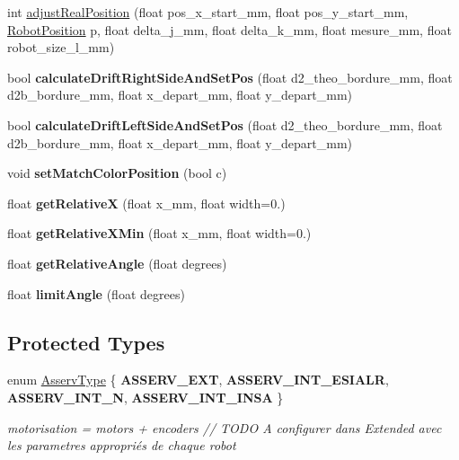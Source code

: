 \begin{DoxyCompactItemize}
int \hyperlink{classAsserv_a1677fd20a9cb16f78c609951e073550e}{adjust\+Real\+Position} (float pos\+\_\+x\+\_\+start\+\_\+mm, float pos\+\_\+y\+\_\+start\+\_\+mm, \hyperlink{structRobotPosition}{Robot\+Position} p, float delta\+\_\+j\+\_\+mm, float delta\+\_\+k\+\_\+mm, float mesure\+\_\+mm, float robot\+\_\+size\+\_\+l\+\_\+mm)
\item 
\mbox{\label{classAsserv_a9e997a871e745e687a4088103378bae3}} 
bool {\bfseries calculate\+Drift\+Right\+Side\+And\+Set\+Pos} (float d2\+\_\+theo\+\_\+bordure\+\_\+mm, float d2b\+\_\+bordure\+\_\+mm, float x\+\_\+depart\+\_\+mm, float y\+\_\+depart\+\_\+mm)
\item 
\mbox{\label{classAsserv_a314e3ff9a8a538a23d26dcb802386024}} 
bool {\bfseries calculate\+Drift\+Left\+Side\+And\+Set\+Pos} (float d2\+\_\+theo\+\_\+bordure\+\_\+mm, float d2b\+\_\+bordure\+\_\+mm, float x\+\_\+depart\+\_\+mm, float y\+\_\+depart\+\_\+mm)
\item 
\mbox{\label{classAsserv_a1405746fd8b2486724eec8baf4e72f74}} 
void {\bfseries set\+Match\+Color\+Position} (bool c)
\item 
\mbox{\label{classAsserv_a7a7e84f37ab3d94c10bcfe0542f7c5ff}} 
float {\bfseries get\+RelativeX} (float x\+\_\+mm, float width=0.)
\item 
\mbox{\label{classAsserv_ac2c223c7a13318de135088a30efc076d}} 
float {\bfseries get\+Relative\+X\+Min} (float x\+\_\+mm, float width=0.)
\item 
\mbox{\label{classAsserv_a790f7ad183fe585a87cefb7ad5688ffe}} 
float {\bfseries get\+Relative\+Angle} (float degrees)
\item 
\mbox{\label{classAsserv_a2a48f3a3252a4311e96f20e2595febff}} 
float {\bfseries limit\+Angle} (float degrees)
\end{DoxyCompactItemize}
\subsection*{Protected Types}
\begin{DoxyCompactItemize}
\item 
enum \hyperlink{classAsserv_ad1cfde496b9ab7fb2cf6fa0d2cf6d8fc}{Asserv\+Type} \{ {\bfseries A\+S\+S\+E\+R\+V\+\_\+\+E\+XT}, 
{\bfseries A\+S\+S\+E\+R\+V\+\_\+\+I\+N\+T\+\_\+\+E\+S\+I\+A\+LR}, 
{\bfseries A\+S\+S\+E\+R\+V\+\_\+\+I\+N\+T\+\_\+N}, 
{\bfseries A\+S\+S\+E\+R\+V\+\_\+\+I\+N\+T\+\_\+\+I\+N\+SA}
 \}\begin{DoxyCompactList}\small\item\em motorisation = motors + encoders // T\+O\+DO A configurer dans Extended avec les parametres appropriés de chaque robot \end{DoxyCompactList}
\end{DoxyCompactItemize}
